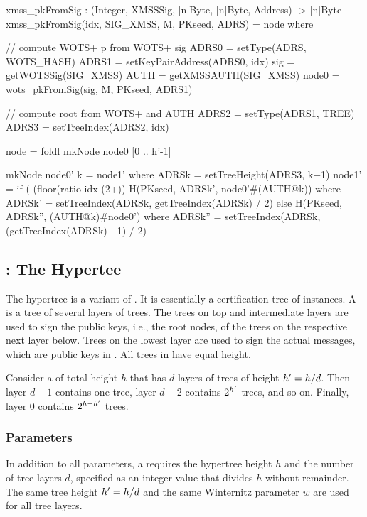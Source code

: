 \begin{code}
  xmss_pkFromSig : (Integer, XMSSSig, [n]Byte, [n]Byte, Address) -> [n]Byte
  xmss_pkFromSig(idx, SIG_XMSS, M, PKseed, ADRS) = node where

    // compute WOTS+ p from WOTS+ sig
    ADRS0 = setType(ADRS, WOTS_HASH)
    ADRS1 = setKeyPairAddress(ADRS0, idx)
    sig = getWOTSSig(SIG_XMSS)
    AUTH = getXMSSAUTH(SIG_XMSS)
    node0 = wots_pkFromSig(sig, M, PKseed, ADRS1)

    // compute root from WOTS+ and AUTH
    ADRS2 = setType(ADRS1, TREE)
    ADRS3 = setTreeIndex(ADRS2, idx)

    node = foldl mkNode node0 [0 .. h'-1]

    mkNode node0' k = node1' where
      ADRSk = setTreeHeight(ADRS3, k+1)
      node1' =
        if ( (floor(ratio idx (2^^k)) %
          H(PKseed, ADRSk', node0'#(AUTH@k)) where
            ADRSk' = setTreeIndex(ADRSk, getTreeIndex(ADRSk) / 2)
        else
          H(PKseed, ADRSk'', (AUTH@k)#node0') where
            ADRSk'' = setTreeIndex(ADRSk, (getTreeIndex(ADRSk) - 1) / 2)
\end{code}

\subsection{\hyper: The Hypertee} \label{sec:hyper}

   The \spx hypertree \hyper is a variant of \xmssm. It is essentially a
   certification tree of \xmss instances. A \hyper is
   a tree of several layers of \xmss trees.  The
   trees on top and intermediate layers are used to sign the public keys, i.e.,
   the root nodes, of the \xmss trees on the respective next layer below.
   Trees on the lowest layer are used to sign the actual messages, which are
   \fors public keys in \spx. All \xmss trees in \hyper have
   equal height.

   Consider a \hyper of total height $h$ that has $d$ layers of \xmss
   trees of height ${h'} = h / d$.  Then layer $d - 1$ contains one \xmss tree,
   layer $d - 2$ contains $2^{{h'}}$ \xmss trees, and so on.  Finally, layer
   0 contains $2^{h - {h'}}$ \xmss trees.

\subsubsection{\hyper Parameters}\label{sec:ht:params}

   In addition to all \xmss parameters, a \hyper requires the hypertree height
   $h$ and the
   number of tree layers $d$, specified as an integer value that divides $h$
   without remainder.  The same tree height ${h'} = h / d$ and the same
   Winternitz parameter $w$ are used for all tree layers.

